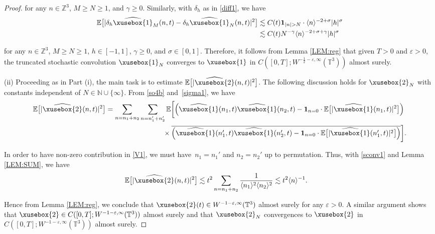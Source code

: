\documentclass[%
11pt,  reqno]{amsart}
\def\<#1>{\xusebox{#1}}
\newcommand{\1}{\hspace{0.2mm}\text{I}\hspace{0.2mm}}
\newcommand{\noi}{\noindent}
\newcommand{\Z}{\mathbb{Z}}
\newcommand{\T}{\mathbb{T}}
\newcommand{\E}{\mathbb{E}}
\newcommand{\dl}{\delta}
\newcommand{\eps}{\varepsilon}
\newcommand{\g}{\gamma}
\newcommand{\s}{\sigma}
\newcommand{\ft}{\widehat}
\newcommand{\cj}{\overline}
\newcommand{\les}{\lesssim}
\newcommand{\jb}[1]
{\langle #1 \rangle}
\newcommand{\ind}{\mathbf 1}
\newcommand{\N}{\mathbb{N}}
\numberwithin{equation}{section}
\numberwithin{theorem}{section}
\begin{document}
\begin{proof}
\noi
for any $n \in \Z^3$, $M \geq N \geq 1$, 
and $\g \geq  0$.
Similarly, with $\dl_h$ as in \eqref{diff1}, we have
\begin{align*}
\E\big[|\dl_h \ft{\<1>}_M(n, t) - \dl_h \ft{\<1>}_N(n, t)|^2\big] 
& \les C(t) \ind_{|n|> N} \cdot \jb{n}^{-2 + \s} |h|^\s\\
& \les C(t) N^{-\g} \jb{n}^{-2 + \s+\g} |h|^\s
\end{align*}

\noi
for any $n \in \Z^3$, $M \geq N \geq 1$, $h \in [-1, 1]$, 
$\g\geq 0$,  and  $\s \in [0, 1]$.
Therefore, it follows from 
Lemma \ref{LEM:reg} that 
given $T>0$ and $\eps > 0$,  the truncated stochastic convolution
$\<1>_N$ converges to $\<1>$
in $C([0, T]; W^{-\frac12 -\eps, \infty}(\T^3))$ almost surely.

	
\smallskip

\noi
(ii) 
Proceeding as in Part (i), the main task is to estimate  
$\E\big[|\ft{\<2>}(n, t)|^2\big] $.
The following discussion holds for $\<2>_N$
with constants independent of $N \in \N\cup\{\infty\}$.
From \eqref{so4b} and~\eqref{sigma1}, we have
\begin{align}
\begin{split}
\E\big[|\ft{\<2>}(n, t)|^2\big] 
& = \sum_{n = n_1 + n_2} 
\sum_{n = n_1' + n_2'}
\E\bigg[ \Big(\ft{\<1>}(n_1, t)\ft{\<1>}(n_2, t)
- \ind_{n = 0} \cdot \E\big[|\ft{\<1>}(n_1, t)|^2\big]\Big)\\
& \hphantom{XXXXXXXXX}
\times
\cj{\Big(\ft{\<1>}(n_1', t)\ft{\<1>}(n_2', t)
- \ind_{n = 0} \cdot \E\big[|\ft{\<1>}(n_1', t)|^2\big]\Big)}\bigg].
\end{split}
\label{V1}
\end{align}

\noi
In order to have non-zero contribution in \eqref{V1}, 
we must have~$n_1 = n_1'$ and $n_2 = n_2'$ up to permutation.
Thus, with \eqref{sconv1} and Lemma \ref{LEM:SUM}, we have
\begin{align}
\E\big[|\ft{\<2>}(n, t)|^2\big] 
& \les t^2 \sum_{n = n_1 + n_2} 
\frac{1}{\jb{n_1}^2 \jb{n_2}^2}
\les t^2 \jb{n}^{-1}.
\label{V2}
\end{align}


\noi
Hence from Lemma \ref{LEM:reg}, 
we conclude that
 $\<2>(t) \in W^{-1 -\eps, \infty}(\T^3)$
 almost surely
 for any $\eps > 0$.
A similar argument shows 
that  $\<2> \in C([0, T]; W^{-1 -\eps, \infty}(\T^3))$
 almost surely
and that 
$\<2>_N$
 convergences to $\<2>$
in 
$C([0, T]; W^{-1 -\eps, \infty}(\T^3))$ almost surely.
\end{proof}
\end{document}
